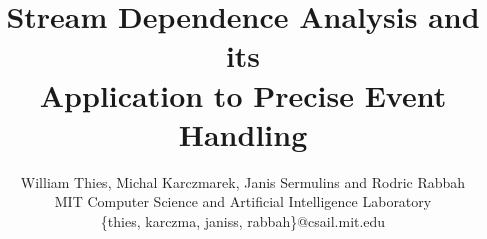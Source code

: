 \documentclass{sig-alternate}
\title{Stream Dependence Analysis and its \\ Application to Precise Event Handling}
\author{
	William Thies, Michal Karczmarek, Janis Sermulins and Rodric Rabbah\\
	\small MIT Computer Science and Artificial Intelligence Laboratory\\
	\small \{thies, karczma, janiss, rabbah\}@csail.mit.edu
}
\begin{document}
\newtheorem{definition}{Definition}
\newtheorem{theorem}{Theorem}
\newtheorem{algorithm}{Algorithm}

\maketitle

\newcommand{\figsdep}[0]{\mt{SDEP}}
\newcommand{\figsdepf}[2]{\mt{SDEP}_{#1 \small{\leftarrow} #2}}
\newcommand{\sdep}[0]{\textsc{sdep}}
\newcommand{\sdepf}[2]{\sdep_{#1 \small{\leftarrow} #2}}
\newcommand{\floor}[2]{\left\lfloor\frac{#1}{#2}\right\rfloor}
\newcommand{\ceil}[2]{\left\lceil\frac{#1}{#2}\right\rceil}

\newcommand{\mt}[1]{\mbox{\it #1}}
\newcommand{\todo}[1]{\framebox{\bf #1}}
\newcommand{\naive}[0]{na\"{\i}ve}
\newcommand{\Naive}[0]{Na\"{\i}ve}
\newcommand{\makeline}[0]{\rule{0cm}{0cm}\\\hrule\rule{0cm}{0cm}}

\begin{abstract}

\end{abstract}






%



{\small
  
  
}


%


\clearpage
%
\clearpage
%
\end{document}
